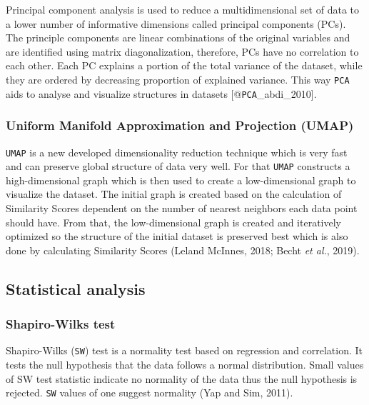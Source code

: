 \documentclass[
  parskip,
  oneside]{scrreprt}
\begin{document}
Principal component analysis is used to reduce a multidimensional set of
data to a lower number of informative dimensions called principal
components (PCs). The principle components are linear combinations of
the original variables and are identified using matrix diagonalization,
therefore, PCs have no correlation to each other. Each PC explains a
portion of the total variance of the dataset, while they are ordered by
decreasing proportion of explained variance. This way \texttt{PCA} aids
to analyse and visualize structures in datasets
{[}@\texttt{PCA}\_abdi\_2010{]}.

\hypertarget{uniform-manifold-approximation-and-projection-umap}{%
\subsubsection{Uniform Manifold Approximation and Projection
(UMAP)}\label{uniform-manifold-approximation-and-projection-umap}}

\texttt{UMAP} is a new developed dimensionality reduction technique
which is very fast and can preserve global structure of data very well.
For that \texttt{UMAP} constructs a high-dimensional graph which is then
used to create a low-dimensional graph to visualize the dataset. The
initial graph is created based on the calculation of Similarity Scores
dependent on the number of nearest neighbors each data point should
have. From that, the low-dimensional graph is created and iteratively
optimized so the structure of the initial dataset is preserved best
which is also done by calculating Similarity Scores (Leland McInnes,
2018; Becht \emph{et al.}, 2019).

\hypertarget{statistical-analysis}{%
\subsection{Statistical analysis}\label{statistical-analysis}}

\hypertarget{shapiro-wilks-test}{%
\subsubsection{Shapiro-Wilks test}\label{shapiro-wilks-test}}

Shapiro-Wilks (\texttt{SW}) test is a normality test based on regression
and correlation. It tests the null hypothesis that the data follows a
normal distribution. Small values of SW test statistic indicate no
normality of the data thus the null hypothesis is rejected. \texttt{SW}
values of one suggest normality (Yap and Sim, 2011).
\end{document}
